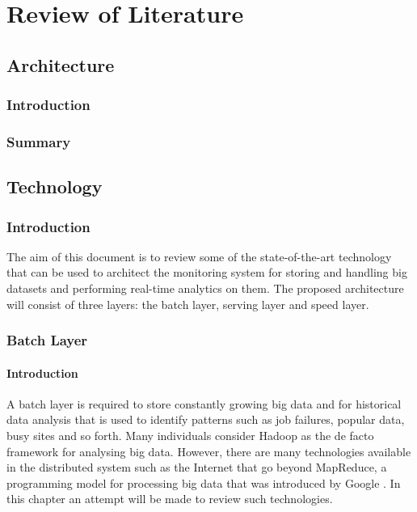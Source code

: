 \chapter{Review of Literature} \label{review-of-literature}

\section{Architecture} \label{Technology}

\subsection{Introduction} \label{subsec-lr-arc-intro}
\subsection{Summary} \label{subsec-lr-arc-summ}

\section{Technology} \label{Technology}

\subsection{Introduction} \label{subsec-lr-tech-intro}

The aim of this document is to review some of the state-of-the-art technology that can be used to architect the monitoring system for storing and handling big datasets and performing real-time analytics on them. The proposed architecture will consist of three layers: the batch layer, serving layer and speed layer.\\

\subsection{Batch Layer} \label{subsec-lr-batchlayer}

\subsubsection{Introduction} \label{subsubsec-lr-batchlayer-intro}
A batch layer is required to store constantly growing big data and for historical data analysis that is used to identify patterns such as job failures, popular data, busy sites and so forth.  Many individuals consider Hadoop as the de facto framework for analysing big data. However, there are many technologies available in the distributed system such as the Internet that go beyond MapReduce, a programming model for processing big data that was introduced by Google \cite{mr-com} . In this chapter an attempt will be made to review such technologies.\\


